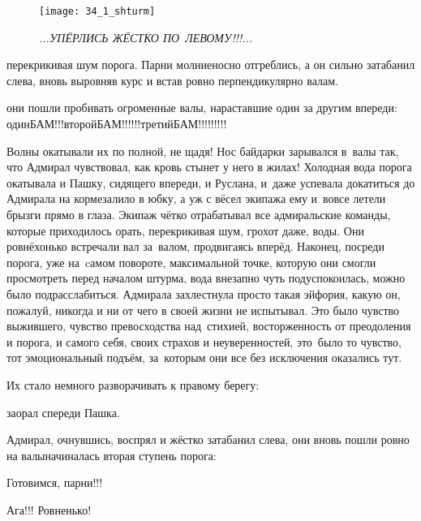 \begin{figure}[h]
	\centering
	\texttt{[image: 34\_1\_shturm]}
	\caption{\small\textit{...УПЁРЛИСЬ ЖЁСТКО ПО~ЛЕВОМУ!!!...}}
\end{figure}

\noindent перекрикивая шум порога. Парни молниеносно отгреблись, а он сильно затабанил слева, вновь выровняв курс и встав ровно перпендикулярно валам. 

\mdash они пошли пробивать огроменные валы, нараставшие один за другим впереди: один\mdash БАМ!!!\mdash второй\mdash БАМ!!!!!!\mdash третий\mdash БАМ!!!!!!!!!

Волны окатывали их по полной, не щадя! Нос байдарки зарывался в~валы так, что Адмирал чувствовал, как кровь стынет у него в жилах! Холодная вода порога окатывала и Пашку, сидящего впереди, и Руслана, и~даже успевала докатиться до Адмирала на корме\mdash залило в юбку, а уж с вёсел экипажа ему и~вовсе летели брызги прямо в глаза. Экипаж чётко отрабатывал все адмиральские команды, которые приходилось орать, перекрикивая шум, грохот даже, воды. Они ровнёхонько встречали вал за~валом, продвигаясь вперёд. Наконец, посреди порога, уже на~cамом повороте, максимальной точке, которую они смогли просмотреть перед началом штурма, вода внезапно чуть подуспокоилась, можно было подрасслабиться. Адмирала захлестнула просто такая эйфория, какую он, пожалуй, никогда и ни от чего в своей жизни не испытывал. Это было чувство выжившего, чувство превосходства над~стихией, восторженность от преодоления и порога, и самого себя, своих страхов и неуверенностей, это~было то чувство, тот эмоциональный подъём, за~которым они все без исключения оказались тут. 

Их стало немного разворачивать к правому берегу:

\mdash заорал спереди Пашка.

Адмирал, очнувшись, воспрял и жёстко затабанил слева, они вновь пошли ровно на валы\mdash начиналась вторая ступень порога:

\diagdash Готовимся, парни!!!

\diagdash Ага!!! Ровненько!

